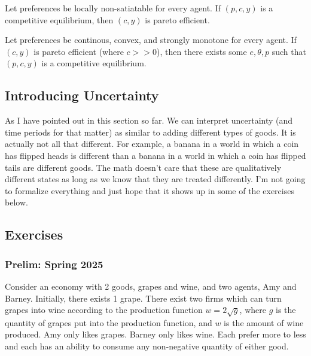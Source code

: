 \documentclass[11pt,english]{article}
\begin{document}
\begin{theorem}
Let preferences be locally non-satiatable for every agent. If $(p,c,y)$ is a competitive equilibrium, then $(c,y)$ is pareto efficient.
\end{theorem}

\begin{theorem}
Let preferences be continous, convex, and strongly monotone for every agent. If $(c,y)$ is pareto efficient (where $c >> 0$), then there exists some $e,\theta, p$ such that $(p,c,y)$ is a competitive equilibrium.
\end{theorem}

\subsection{Introducing Uncertainty}
As I have pointed out in this section so far. We can interpret uncertainty (and time periods for that matter) as similar to adding different types of goods. It is actually not all that different. For example, a banana in a world in which a coin has flipped heads is different than a banana in a world in which a coin has flipped tails are different goods. The math doesn't care that these are qualitatively different states as long as we know that they are treated differently. I'm not going to formalize everything and just hope that it shows up in some of the exercises below.

\subsection{Exercises}
\subsubsection{Prelim: Spring 2025}\label{Phelan Prelim: Spring 2025}
Consider an economy with 2 goods, grapes and wine, and two agents, Amy and Barney. Initially, there exists 1 grape. There exist two firms which can turn grapes into wine according to the production function $w = 2\sqrt{g}$, where $g$ is the quantity of grapes put into the production function, and $w$ is the amount of wine produced. Amy only likes grapes. Barney only likes wine. Each prefer more to less and each has an ability to consume any non-negative quantity of either good.
\end{document}
